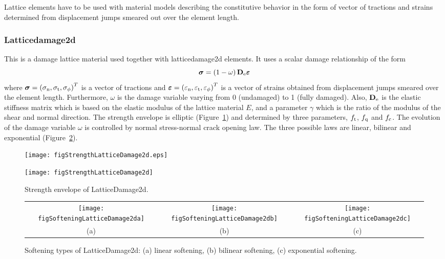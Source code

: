 \documentclass[a4paper]{article}
\begin{document}
Lattice elements have to be used with material models describing the constitutive behavior in the form of vector of  tractions and strains determined from displacement jumps smeared out over the element length.

\subsubsection{Latticedamage2d}
This is a damage lattice material used together with latticedamage2d elements.
It uses a scalar damage relationship of the form
\begin{equation}
\boldsymbol{\sigma} = \left(1-\omega\right) \mathbf{D}_{\rm e} \boldsymbol{\varepsilon}
\end{equation}
where $\boldsymbol{\sigma} = \left( \sigma_{\rm n}, \sigma_{\rm t}, \sigma_{\rm \phi}\right)^{T}$ is a vector of tractions and $\boldsymbol{\varepsilon} = \left( \varepsilon_{\rm n}, \varepsilon_{\rm t}, \varepsilon_{\rm \phi}\right)^{T}$ is a vector of strains obtained from displacement jumps smeared over the element length.
Furthermore, $\omega$ is the damage variable varying from 0 (undamaged) to 1 (fully damaged). 
Also, $\mathbf{D}_{\rm e}$ is the elastic stiffness matrix which is based on the elastic modulus of the lattice material $E$, and a parameter $\gamma$ which is the ratio of the modulus of the shear and normal direction.
The strength envelope is elliptic (Figure~\ref{StrengthLatticeDamage2d}) and determined by three  parameters, $f_{\rm t}$, $f_{\rm q}$ and $f_{\rm c}$. The evolution of the damage variable $\omega$ is controlled by normal stress-normal crack opening law. The three possible laws are linear, bilinear and exponential (Figure~\ref{SofteningLatticeDamage2d}).

\begin{figure}[!htb]
\begin{htmlonly}
  \centerline{\texttt{[image: figStrengthLatticeDamage2d.eps]}}
\end{htmlonly}
 \centerline{\texttt{[image: figStrengthLatticeDamage2d]}}
  \caption{Strength envelope of LatticeDamage2d.}
  \label{StrengthLatticeDamage2d}
\end{figure}


\begin{figure}[!htb]
\begin{tabular}{ccc}
\texttt{[image: figSofteningLatticeDamage2da]} & \texttt{[image: figSofteningLatticeDamage2db]} & \texttt{[image: figSofteningLatticeDamage2dc]}\\
(a) & (b) & (c)
\end{tabular}
  \caption{Softening types of LatticeDamage2d: (a) linear softening, (b) bilinear softening, (c) exponential softening.}
  \label{SofteningLatticeDamage2d}
\end{figure}
\end{document}
